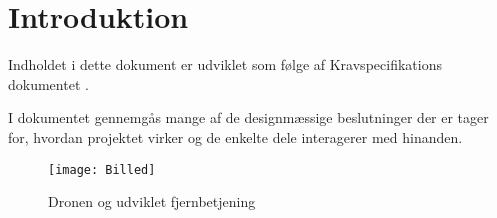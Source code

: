\documentclass[Main]{Subfiles}
\begin{document}
\chapter{Introduktion}
Indholdet i dette dokument er udviklet som følge af Kravspecifikations dokumentet \cite{KravSpec}.

I dokumentet gennemgås mange af de designmæssige beslutninger der er tager for, hvordan projektet virker og de enkelte dele interagerer med hinanden.


\begin{figure}[H]
\centering
\texttt{[image: Billed]}
\caption{Dronen og udviklet fjernbetjening}
\end{figure}
\end{document}
